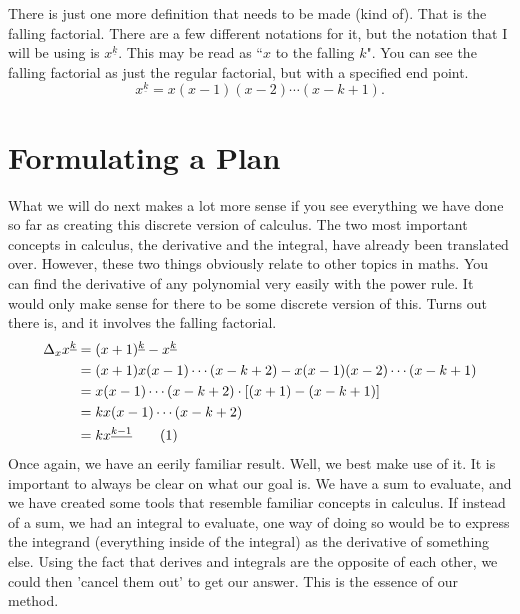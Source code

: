 \documentclass[a4paper]{article}
\theoremstyle{definition}
\begin{document}
There is just one more definition that needs to be made (kind of).
That is the falling factorial.
There are a few different notations for it, but the notation that I will be using is $x^{\underline{k}}$.
This may be read as ``$x$ to the falling $k$".
You can see the falling factorial as just the regular factorial, but with a specified end point.
\begin{equation}
    x^{\underline{k}} = x(x-1)(x-2)\cdots(x-k+1).
\end{equation}

\section{Formulating a Plan}

What we will do next makes a lot more sense if you see everything we have done so far as creating this discrete version of calculus.
The two most important concepts in calculus, the derivative and the integral, have already been translated over.
However, these two things obviously relate to other topics in maths.
You can find the derivative of any polynomial very easily with the power rule.
It would only make sense for there to be some discrete version of this.
Turns out there is, and it involves the falling factorial.
\begin{align*}
    \Delta_x x^{\underline{k}} & = (x+1)^{\underline{k}} - x^{\underline{k}}                     \\
                               & = (x+1)x(x-1)\cdots(x-k+2) - x(x-1)(x-2)\cdots(x-k+1)           \\
                               & = x(x-1)\cdots(x-k+2) \cdot [(x+1) - (x-k+1)]                   \\
                               & = kx(x-1)\cdots(x-k+2)                                          \\
                               & = kx^{\underline{k-1}} \stepcounter{equation}\tag{\theequation}
\end{align*}
Once again, we have an eerily familiar result.
Well, we best make use of it.
It is important to always be clear on what our goal is.
We have a sum to evaluate, and we have created some tools that resemble familiar concepts in calculus.
If instead of a sum, we had an integral to evaluate, one way of doing so would be to express the integrand (everything inside of the integral) as the derivative of something else.
Using the fact that derives and integrals are the opposite of each other, we could then 'cancel them out' to get our answer.
This is the essence of our method.
\end{document}
